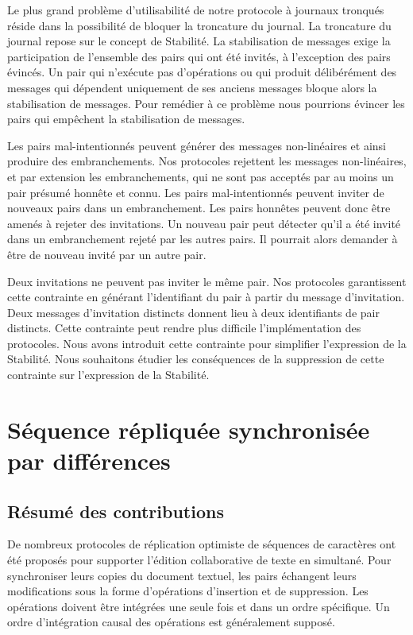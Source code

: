 Le plus grand problème d'utilisabilité de notre protocole à journaux tronqués réside dans la possibilité de bloquer la troncature du journal.
La troncature du journal repose sur le concept de Stabilité.
La stabilisation de messages exige la participation de l'ensemble des pairs qui ont été invités, à l'exception des pairs évincés.
Un pair qui n'exécute pas d'opérations ou qui produit délibérément des messages qui dépendent uniquement de ses anciens messages bloque alors la stabilisation de messages.
Pour remédier à ce problème nous pourrions évincer les pairs qui empêchent la stabilisation de messages.

Les pairs mal-intentionnés peuvent générer des messages non-linéaires et ainsi produire des embranchements.
Nos protocoles rejettent les messages non-linéaires, et par extension les embranchements, qui ne sont pas acceptés par au moins un pair présumé honnête et connu.
Les pairs mal-intentionnés peuvent inviter de nouveaux pairs dans un embranchement.
Les pairs honnêtes peuvent donc être amenés à rejeter des invitations.
Un nouveau pair peut détecter qu'il a été invité dans un embranchement rejeté par les autres pairs.
Il pourrait alors demander à être de nouveau invité par un autre pair.

Deux invitations ne peuvent pas inviter le même pair.
Nos protocoles garantissent cette contrainte en générant l'identifiant du pair à partir du message d'invitation.
Deux messages d'invitation distincts donnent lieu à deux identifiants de pair distincts.
Cette contrainte peut rendre plus difficile l'implémentation des protocoles.
Nous avons introduit cette contrainte pour simplifier l'expression de la Stabilité.
Nous souhaitons étudier les conséquences de la suppression de cette contrainte sur l'expression de la Stabilité.


\section{Séquence répliquée synchronisée par différences}

\subsection{Résumé des contributions}

De nombreux protocoles de réplication optimiste de séquences de caractères ont été proposés pour supporter l'édition collaborative de texte en simultané.
Pour synchroniser leurs copies du document textuel, les pairs échangent leurs modifications sous la forme d'opérations d'insertion et de suppression.
Les opérations doivent être intégrées une seule fois et dans un ordre spécifique.
Un ordre d'intégration causal des opérations est généralement supposé.

